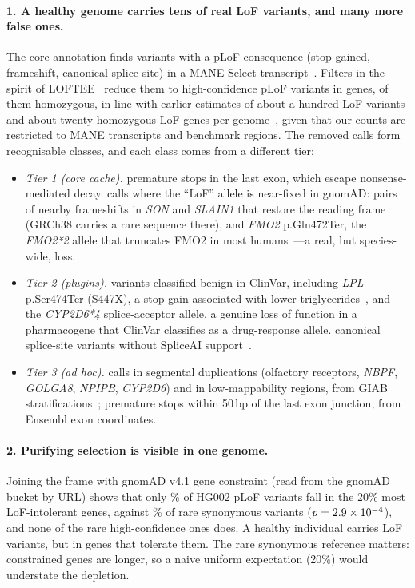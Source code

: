 \paragraph{1. A healthy genome carries tens of real LoF variants, and many
more false ones.} The core annotation finds \NPlof{} variants with a pLoF
consequence (stop-gained, frameshift, canonical splice site) in a MANE
Select transcript~\cite{morales2022}. Filters in the spirit of
LOFTEE~\cite{karczewski2020} reduce them to \NHc{} high-confidence pLoF
variants in \NHcGenes{} genes, \NHcHom{} of them homozygous, in line with
earlier estimates of about a hundred LoF variants and about twenty
homozygous LoF genes per genome~\cite{macarthur2012}, given that our counts
are restricted to MANE transcripts and benchmark regions. The removed calls
form recognisable classes, and each class comes from a different tier:
\begin{itemize}
\item \emph{Tier 1 (core cache).} \FlagLastExon{} premature stops in the
  last exon, which escape nonsense-mediated decay. \FlagRefMinor{} calls
  where the ``LoF'' allele is near-fixed in gnomAD: pairs of nearby
  frameshifts in \textit{SON} and \textit{SLAIN1} that restore the reading
  frame (GRCh38 carries a rare sequence there), and \textit{FMO2}
  p.Gln472Ter, the \textit{FMO2*2} allele that truncates FMO2 in most
  humans~\cite{dolphin1998}---a real, but species-wide, loss.
\item \emph{Tier 2 (plugins).} \FlagClinvarBenign{} variants classified
  benign in ClinVar, including \textit{LPL} p.Ser474Ter (S447X), a stop-gain
  associated with lower triglycerides~\cite{rip2006}, and the
  \textit{CYP2D6*4} splice-acceptor allele, a genuine loss of function in a
  pharmacogene that ClinVar classifies as a drug-response allele.
  \FlagSpliceai{} canonical splice-site variants without SpliceAI
  support~\cite{jaganathan2019}.
\item \emph{Tier 3 (ad hoc).} \FlagSegdup{} calls in segmental duplications
  (olfactory receptors, \textit{NBPF}, \textit{GOLGA8}, \textit{NPIPB},
  \textit{CYP2D6}) and \FlagLowmap{} in low-mappability regions, from GIAB
  stratifications~\cite{dwarshuis2024}; \FlagFiftybp{} premature stops within
  50\,bp of the last exon junction, from Ensembl exon coordinates.
\end{itemize}

\paragraph{2. Purifying selection is visible in one genome.} Joining the
frame with gnomAD v4.1 gene constraint (read from the gnomAD bucket by URL)
shows that only \LoeufAllPlofPct\% of HG002 pLoF variants fall in the 20\%
most LoF-intolerant genes, against \LoeufSynPct\% of rare synonymous variants
($p=2.9\times10^{-4}$), and none of the rare high-confidence ones does. A
healthy individual carries LoF variants, but in genes that tolerate them.
The rare synonymous reference matters: constrained genes are longer, so a
naive uniform expectation (20\%) would understate the depletion.

